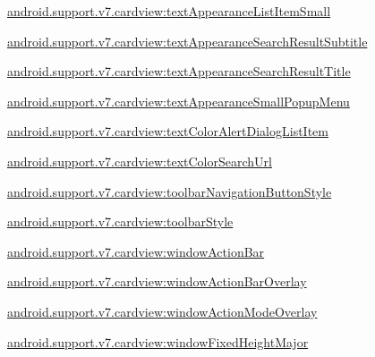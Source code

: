 {\ttfamily \hyperlink{classandroid_1_1support_1_1v7_1_1cardview_1_1R_1_1styleable_a0dbb87b74ed823cda913ce4dc15a0df3}{android.\+support.\+v7.\+cardview\+:text\+Appearance\+List\+Item\+Small}}

{\ttfamily \hyperlink{classandroid_1_1support_1_1v7_1_1cardview_1_1R_1_1styleable_a5c6429ab74191c03ded7047f5aa85f30}{android.\+support.\+v7.\+cardview\+:text\+Appearance\+Search\+Result\+Subtitle}}

{\ttfamily \hyperlink{classandroid_1_1support_1_1v7_1_1cardview_1_1R_1_1styleable_a1b75dd408c582ec70493e7f69ec4ad8e}{android.\+support.\+v7.\+cardview\+:text\+Appearance\+Search\+Result\+Title}}

{\ttfamily \hyperlink{classandroid_1_1support_1_1v7_1_1cardview_1_1R_1_1styleable_a5c5300533d341ed70cf8866e7cea0fab}{android.\+support.\+v7.\+cardview\+:text\+Appearance\+Small\+Popup\+Menu}}

{\ttfamily \hyperlink{classandroid_1_1support_1_1v7_1_1cardview_1_1R_1_1styleable_a730df5f1aaa02f6f44026aa8cd716f2a}{android.\+support.\+v7.\+cardview\+:text\+Color\+Alert\+Dialog\+List\+Item}}

{\ttfamily \hyperlink{classandroid_1_1support_1_1v7_1_1cardview_1_1R_1_1styleable_af07efe85225b786325d19d1acd12a0a9}{android.\+support.\+v7.\+cardview\+:text\+Color\+Search\+Url}}

{\ttfamily \hyperlink{classandroid_1_1support_1_1v7_1_1cardview_1_1R_1_1styleable_a6ccca53fe196080e3926237eed8f3b67}{android.\+support.\+v7.\+cardview\+:toolbar\+Navigation\+Button\+Style}}

{\ttfamily \hyperlink{classandroid_1_1support_1_1v7_1_1cardview_1_1R_1_1styleable_ad3252ce0472f8a493dfefb321b238ec9}{android.\+support.\+v7.\+cardview\+:toolbar\+Style}}

{\ttfamily \hyperlink{classandroid_1_1support_1_1v7_1_1cardview_1_1R_1_1styleable_a447b7ac42a9d74fe8464e5d6fdeaba6c}{android.\+support.\+v7.\+cardview\+:window\+Action\+Bar}}

{\ttfamily \hyperlink{classandroid_1_1support_1_1v7_1_1cardview_1_1R_1_1styleable_a283227c3d60e7ad20f595ff0f405c274}{android.\+support.\+v7.\+cardview\+:window\+Action\+Bar\+Overlay}}

{\ttfamily \hyperlink{classandroid_1_1support_1_1v7_1_1cardview_1_1R_1_1styleable_a2e20d285d36c8aee404b1d719af3b081}{android.\+support.\+v7.\+cardview\+:window\+Action\+Mode\+Overlay}}

{\ttfamily \hyperlink{classandroid_1_1support_1_1v7_1_1cardview_1_1R_1_1styleable_af7d8d8ae32e20793c811cd2892bd854b}{android.\+support.\+v7.\+cardview\+:window\+Fixed\+Height\+Major}}

